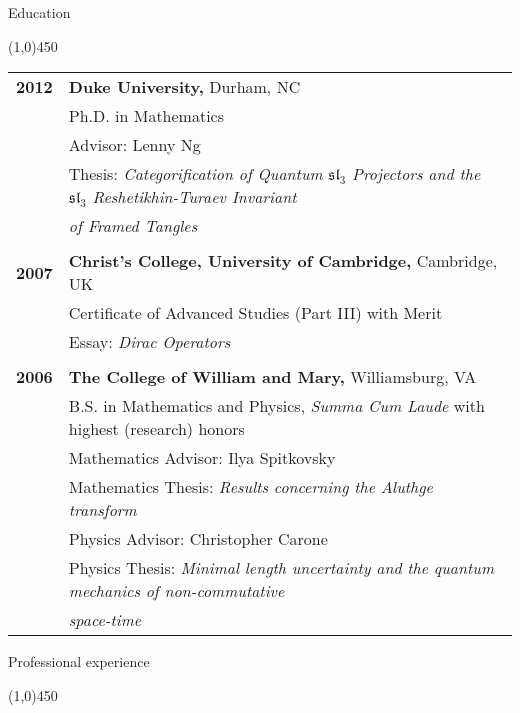 \documentclass[10pt]{article}
\begin{document}
\bigskip
\noindent
{\large \sc Education}

\vspace{-0.1in}
\noindent
\line(1,0){450}

\smallskip

\begin{center} {
\begin{tabular}{l l}
{\bf 2012} %
& {\bf Duke University,} Durham, NC \\
& {Ph.D. in Mathematics} \\
& {Advisor: Lenny Ng}\\
& {Thesis: \emph{Categorification of Quantum $\mathfrak{sl}_3$ Projectors 
	and the $\mathfrak{sl}_3$ Reshetikhin-Turaev Invariant} 
}\\ &{
\emph{of Framed Tangles}}\\
\\
{\bf 2007} %
& {\bf Christ's College, University of Cambridge,} Cambridge, UK \\
& {Certificate of Advanced Studies (Part III) with Merit} \\
& {Essay: \emph{Dirac Operators}} \\
\\
{\bf 2006} %
& {\bf The College of William and Mary,} Williamsburg, VA \\ 
& {B.S. in Mathematics and Physics, \emph{Summa Cum Laude} with highest (research) honors}\\
& {Mathematics Advisor: Ilya Spitkovsky}\\
& {Mathematics Thesis: \emph{Results concerning the Aluthge transform}}\\
& {Physics Advisor: Christopher Carone}\\
& {Physics Thesis: \emph{Minimal length uncertainty and the quantum mechanics of non-commutative}
}\\ &{
\emph{space-time}}\\
\end{tabular}
}
\end{center}

\bigskip
\noindent
{\large \sc Professional experience}

\vspace{-0.1in}
\noindent
\line(1,0){450}
\end{document}

